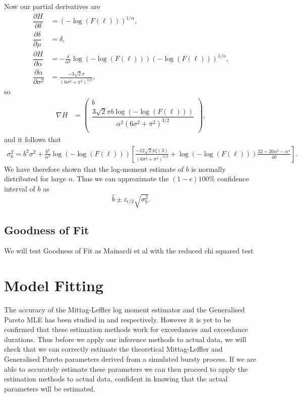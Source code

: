 \documentclass[honours,12pt]{unswthesis}
\newcommand{\1}{\mathbf 1}
\newcommand{\ppartial}[2]{\dfrac{\partial {#1}}{\partial {#2} }}
\numberwithin{equation}{section}
\theoremstyle{definition}
\theoremstyle{remark}
\begin{document}
Now our partial derivatives are
\begin{align*}
\ppartial{H}{\delta}&=(-\log(F(\ell)))^{1/\alpha},\\ 
\ppartial{\delta}{\mu}&=\delta,\\
 \ppartial{H}{\alpha}&=-\frac{\delta}{\alpha^2}\log(-\log(F(\ell)))(-\log(F(\ell)))^{1/\alpha},\\ 
 \ppartial{\alpha}{\sigma^2}&=\frac{-3\sqrt{2}\pi}{(6\sigma^2+\pi^2)^{3/2}},
\end{align*}
so
\begin{align*}
	\nabla H &=\begin{pmatrix}
		b\\
		\dfrac{3\sqrt{2}\pi b \log(-\log(F(\ell)))}{\alpha^2(6\sigma^2+\pi^2)^{3/2}} \\
	\end{pmatrix},
\end{align*}
and it follows that
\begin{align*}
 \sigma^2_b= b^2\sigma^2 +\frac{b^2}{\alpha^2}\log(-\log(F(\ell)))
 \left[
 \frac{-12\sqrt{2}\pi\zeta(3)}{(6\sigma^2+\pi^2)^{3/2}} + \log(-\log(F(\ell)))\frac{32-20\alpha^2-\alpha^4}{40}
 \right].
\end{align*}
We have therefore shown that the log-moment estimate of $b$ is normally distributed for large $n$. Thus we can approximate the $(1-\epsilon)100\%$ confidence interval of $b$ as
\[
	\hat{b}\pm z_{\epsilon/2}\sqrt{\sigma^2_b}.
\]
\section{Goodness of Fit}%
We will test Goodness of Fit as Mainardi et al with the reduced chi squared test
\chapter{Model Fitting}
The accuracy of the Mittag-Leffler log moment estimator and the Generalised Pareto MLE has been studied 
in \cite{Cahoy2013} and \cite{GPaccuracyCitation} respectively. However it is yet to be confirmed that these estimation methods work for exceedances and exceedance durations. Thus before we apply our inference methods to actual data, we will check that we can correctly estimate the theoretical Mittag-Leffler and Generalised Pareto parameters derived from a simulated bursty process. If we are able to accurately estimate these parameters we can then proceed to apply the estimation methods to actual data, confident in knowing that the actual parameters will be estimated.
\end{document}

